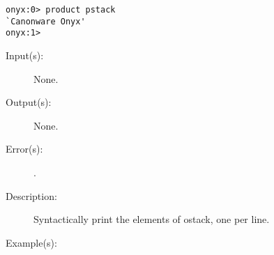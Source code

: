 \begin{description}
\begin{description}
\begin{verbatim}
onyx:0> product pstack
`Canonware Onyx'
onyx:1>
		\end{verbatim}
	\end{description}
\label{systemdict:pstack}
\item[{\onyxop{--}{pstack}{--}}: ]
	\begin{description}\item[]
	\item[Input(s): ] None.
	\item[Output(s): ] None.
	\item[Error(s): ]
		\begin{description}\item[]
		\item[.]
		\end{description}
	\item[Description: ]
		Syntactically print the elements of ostack, one per line.
	\item[Example(s): ]\begin{verbatim}


\end{verbatim}
\end{description}
\end{description}
